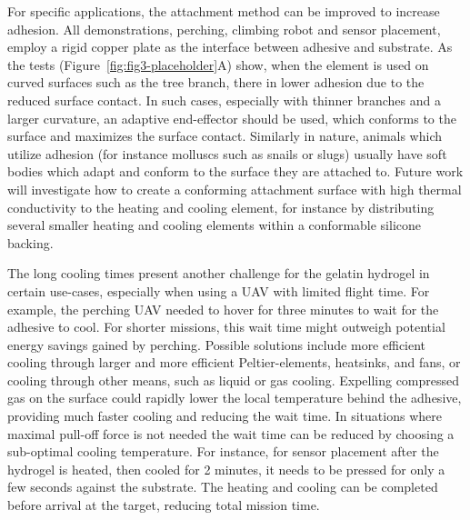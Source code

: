 For specific applications, the attachment method can be improved to increase adhesion. All demonstrations, perching, climbing robot and sensor placement, employ a rigid copper plate as the interface between adhesive and substrate. As the tests (Figure~\ref{fig:fig3-placeholder}A) show, when the element is used on curved surfaces such as the tree branch, there in lower adhesion due to the reduced surface contact. In such cases, especially with thinner branches and a larger curvature, an adaptive end-effector should be used, which conforms to the surface and maximizes the surface contact. Similarly in nature, animals which utilize adhesion (for instance molluscs such as snails or slugs) usually have soft bodies which adapt and conform to the surface they are attached to. Future work will investigate how to create a conforming attachment surface with high thermal conductivity to the heating and cooling element, for instance by distributing several smaller heating and cooling elements within a conformable silicone backing.

The long cooling times present another challenge for the gelatin hydrogel in certain use-cases, especially when using a UAV with limited flight time. For example, the perching UAV needed to hover for three minutes to wait for the adhesive to cool. For shorter missions, this wait time might outweigh potential energy savings gained by perching. Possible solutions include more efficient cooling through larger and more efficient Peltier-elements, heatsinks, and fans, or cooling through other means, such as liquid or gas cooling. Expelling compressed gas on the surface could rapidly lower the local temperature behind the adhesive, providing much faster cooling and reducing the wait time. In situations where maximal pull-off force is not needed the wait time can be reduced by choosing a sub-optimal cooling temperature. For instance, for sensor placement after the hydrogel is heated, then cooled for 2 minutes, it needs to be pressed for only a few seconds against the substrate. The heating and cooling can be completed before arrival at the target, reducing total mission time.



